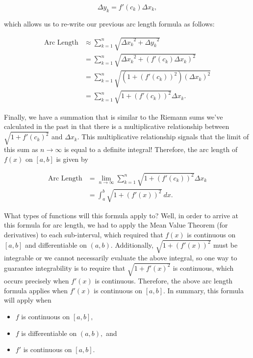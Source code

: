 \documentclass[handout,nooutcomes]{ximera}
\begin{document}
$$\Delta y_k = f'(c_k) \Delta x_k,$$

which allows us to re-write our previous arc length formula as follows:

\begin{align*}
\text{Arc Length} &\approx \displaystyle\sum_{k=1}^n \sqrt{{{\Delta x}_k}^2+{{\Delta y}_k}^2} \\
&= \displaystyle\sum_{k=1}^n \sqrt{{{\Delta x}_k}^2 + (f'(c_k) \Delta x_k)^2} \\
&= \displaystyle\sum_{k=1}^n \sqrt{(1+(f'(c_k))^2)(\Delta x _k)^2} \\
&= \displaystyle\sum_{k=1}^n \sqrt{1+(f'(c_k))^2} \Delta x _k.
\end{align*}

Finally, we have a summation that is similar to the Riemann sums we've calculated in the past in that there is a multiplicative relationship between $\sqrt{1+{f'(c_k)}^2}$ and $\Delta x _k$.  This multiplicative relationship signals that the limit of this sum as $n \to \infty$ is equal to a definite integral!  Therefore, the arc length of $f(x)$ on $[a,b]$ is given by

\begin{align*}
\text{Arc Length} &= \displaystyle\lim_{n \to \infty} \displaystyle\sum_{k=1}^n \sqrt{1+(f'(c_k))^2} \Delta x _k \\
&= \displaystyle\int_{a}^{b} \sqrt{1+(f'(x))^2} \ dx .
\end{align*}

What types of functions will this formula apply to?  Well, in order to arrive at this formula for arc length, we had to apply the Mean Value Theorem (for derivatives) to each sub-interval, which required that $f(x)$ is continuous on $[a,b]$ and differentiable on $(a,b).$  Additionally, $\sqrt{1+(f'(x))^2}$ must be integrable or we cannot necessarily evaluate the above integral, so one way to guarantee integrability is to require that $\sqrt{1+{f'(x)}^2}$ is continuous, which occurs precisely when $f'(x)$ is continuous.  Therefore, the above arc length formula applies when $f'(x)$ is continuous on $[a,b]$.  In summary, this formula will apply when

\begin{itemize}

\item $f$ is continuous on $[a,b],$
\item $f$ is differentiable on $(a,b),$ and
\item $f'$ is continuous on $[a,b]$.

\end{itemize}
\end{document}
